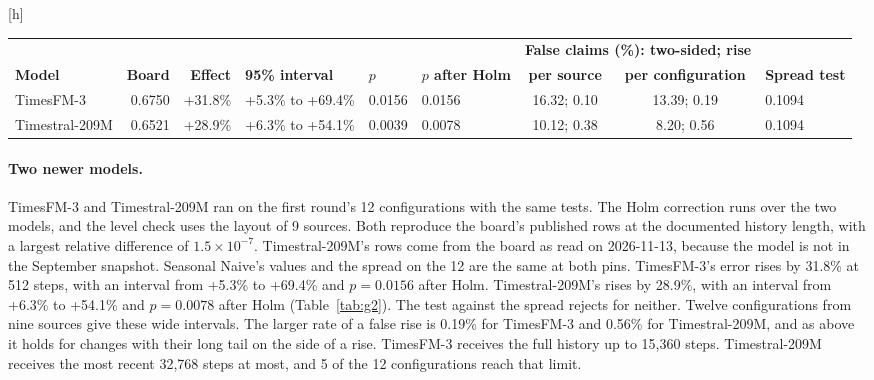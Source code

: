 \documentclass{article}
\makeatletter
\renewenvironment{table}
  {\setlength{\abovecaptionskip}{6\p@}%
   \setlength{\belowcaptionskip}{\z@}%
   \@float{table}}
  {\end@float}
\makeatother
\begin{document}
\begin{table}[h]
\centering
\scriptsize
\setlength{\tabcolsep}{4pt}
\begin{tabular}{@{}lrrlllccl@{}}
\toprule
& & & & & & \multicolumn{2}{c}{\textbf{False claims (\%): two-sided; rise}} & \\
\cmidrule(lr){7-8}
\textbf{Model} & \textbf{Board} & \textbf{Effect} & \textbf{95\% interval} & \textbf{$p$} &
\textbf{$p$ after Holm} & \textbf{per source} & \textbf{per configuration} &
\textbf{Spread test} \\
\midrule
TimesFM-3 & 0.6750 & +31.8\% & +5.3\% to +69.4\% & 0.0156 & 0.0156 & 16.32; 0.10 & 13.39; 0.19 & 0.1094 \\
Timestral-209M & 0.6521 & +28.9\% & +6.3\% to +54.1\% & 0.0039 & 0.0078 & 10.12; 0.38 & 8.20; 0.56 & 0.1094 \\
\bottomrule
\end{tabular}
\caption{Two newer models on the first round's 12 configurations, from 9 sources, with the Holm
correction over the two models. The board column gives the geometric mean of scaled MASE of
the board's published rows, which our runs reproduce at the documented history length. The
last column is the p-value after Holm of the test against the spread of the displayed top ten,
which is 9.34\% on the 12. Twelve configurations from nine sources give wide intervals.}
\label{tab:g2}
\end{table}

\paragraph{Two newer models.} TimesFM-3 \citep{timesfm} and Timestral-209M \citep{timestral}
ran on the first round's 12 configurations with the same tests. The Holm correction runs over
the two models, and the level check uses the layout of 9 sources. Both reproduce the board's published rows at the
documented history length, with a largest relative difference of $1.5\times10^{-7}$.
Timestral-209M's rows come from the board as read on 2026-11-13, because the model is not in
the September snapshot. Seasonal Naive's values and the spread on the 12 are the same at both
pins. TimesFM-3's error rises by 31.8\% at 512 steps, with an interval from +5.3\% to +69.4\%
and $p = 0.0156$ after Holm. Timestral-209M's rises by 28.9\%, with an interval from +6.3\% to
+54.1\% and $p = 0.0078$ after Holm (Table~\ref{tab:g2}). The test against the spread rejects
for neither. Twelve configurations from nine sources give these wide intervals. The larger rate
of a false rise is 0.19\% for TimesFM-3 and 0.56\% for Timestral-209M, and as above it holds
for changes with their long tail on the side of a rise. TimesFM-3 receives the full history up
to 15,360 steps. Timestral-209M receives the most recent 32,768 steps at most, and 5 of the 12
configurations reach that limit.
\end{document}
